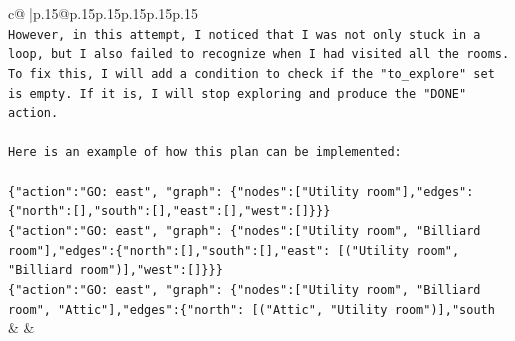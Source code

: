 \documentclass{article}
\begin{document}
{\begin{supertabular}{c@{$\;$}|p{.15\linewidth}@{}p{.15\linewidth}p{.15\linewidth}p{.15\linewidth}p{.15\linewidth}p{.15\linewidth}}
{{{\\ 
\texttt{However, in this attempt, I noticed that I was not only stuck in a loop, but I also failed to recognize when I had visited all the rooms. To fix this, I will add a condition to check if the "to\_explore" set is empty. If it is, I will stop exploring and produce the "DONE" action.} \\
\\ 
\texttt{Here is an example of how this plan can be implemented:} \\
\\ 
\texttt{\{"action":"GO: east", "graph": \{"nodes":{[}"Utility room"{]},"edges":\{"north":{[}{]},"south":{[}{]},"east":{[}{]},"west":{[}{]}\}\}\}} \\
\texttt{\{"action":"GO: east", "graph": \{"nodes":{[}"Utility room", "Billiard room"{]},"edges":\{"north":{[}{]},"south":{[}{]},"east": {[}("Utility room", "Billiard room"){]},"west":{[}{]}\}\}\}} \\
\texttt{\{"action":"GO: east", "graph": \{"nodes":{[}"Utility room", "Billiard room", "Attic"{]},"edges":\{"north": {[}("Attic", "Utility room"){]},"south} \\
            }
        }
    }
    & & \\ \\

\end{supertabular}
}
\end{document}
